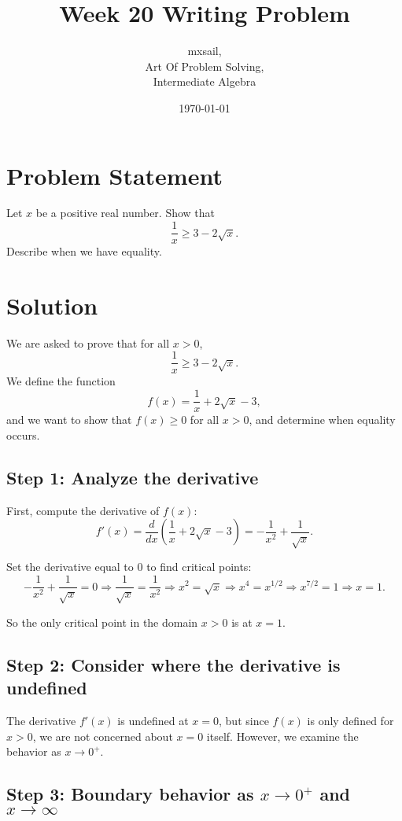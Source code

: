 \documentclass{article}
\title{Week 20 Writing Problem}
\author{mxsail, \\ Art Of Problem Solving,\\ Intermediate Algebra}
\date{\today}
\begin{document}
\maketitle

\section*{Problem Statement}
Let $x$ be a positive real number. Show that
\[
\frac{1}{x} \ge 3 - 2 \sqrt{x}.
\]
Describe when we have equality.

\section*{Solution}

We are asked to prove that for all $x > 0$,
\[
\frac{1}{x} \ge 3 - 2\sqrt{x}.
\]
We define the function
\[
f(x) = \frac{1}{x} + 2\sqrt{x} - 3,
\]
and we want to show that $f(x) \ge 0$ for all $x > 0$, and determine when equality occurs.

\subsection*{Step 1: Analyze the derivative}

First, compute the derivative of $f(x)$:
\[
f'(x) = \frac{d}{dx}\left(\frac{1}{x} + 2\sqrt{x} - 3\right) = -\frac{1}{x^2} + \frac{1}{\sqrt{x}}.
\]

Set the derivative equal to 0 to find critical points:
\[
-\frac{1}{x^2} + \frac{1}{\sqrt{x}} = 0
\Rightarrow \frac{1}{\sqrt{x}} = \frac{1}{x^2}
\Rightarrow x^2 = \sqrt{x}
\Rightarrow x^4 = x^{1/2}
\Rightarrow x^{7/2} = 1
\Rightarrow x = 1.
\]

So the only critical point in the domain $x > 0$ is at $x = 1$.

\subsection*{Step 2: Consider where the derivative is undefined}

The derivative $f'(x)$ is undefined at $x = 0$, but since $f(x)$ is only defined for $x > 0$, we are not concerned about $x = 0$ itself. However, we examine the behavior as $x \to 0^+$.

\subsection*{Step 3: Boundary behavior as $x \to 0^+$ and $x \to \infty$}
\end{document}
